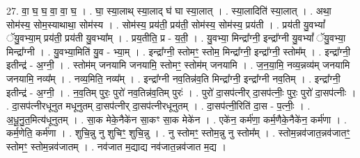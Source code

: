 \documentclass[17pt]{extarticle}
\begin{document}
27. वा॒ घ॒ घ॒ वा॒ वा॒ घ॒ । . घा॒ स्या॒लाथ् स्या॒लाद् घ॑ घा स्या॒लात् । . स्या॒लादिति॑ स्या॒लात् । . अथा॒ सोम॑स्य॒ सोम॒स्याथाथा॒ सोम॑स्य । . सोम॑स्य॒ प्रय॑ती॒ प्रय॑ती॒ सोम॑स्य॒ सोम॑स्य॒ प्रय॑ती । . प्रय॑ती यु॒वभ्यां᳚ ॅयु॒वभ्या॒म् प्रय॑ती॒ प्रय॑ती यु॒वभ्या᳚म् । . प्रय॒तीति॒ प्र - य॒ती॒ । . यु॒वभ्या॒ मिन्द्रा᳚ग्नी॒ इन्द्रा᳚ग्नी यु॒वभ्यां᳚ ॅयु॒वभ्या॒ मिन्द्रा᳚ग्नी । . यु॒वभ्या॒मिति॑ यु॒व - भ्या॒म् । . इन्द्रा᳚ग्नी॒ स्तोमꣳ॒॒ स्तोम॒ मिन्द्रा᳚ग्नी॒ इन्द्रा᳚ग्नी॒ स्तोम᳚म् । . इन्द्रा᳚ग्नी॒ इतीन्द्र॑ - अ॒ग्नी॒ । . स्तोम॑म् जनयामि जनयामि॒ स्तोमꣳ॒॒ स्तोम॑म् जनयामि । . ज॒न॒या॒मि॒ नव्य॒न्नव्य॑म् जनयामि जनयामि॒ नव्य᳚म् । . नव्य॒मिति॒ नव्य᳚म् । . इन्द्रा᳚ग्नी नव॒तिन्न॑व॒ति मिन्द्रा᳚ग्नी॒ इन्द्रा᳚ग्नी नव॒तिम् । . इन्द्रा᳚ग्नी॒ इतीन्द्र॑ - अ॒ग्नी॒ । . न॒व॒तिम् पुरः॒ पुरो॑ नव॒तिन्न॑व॒तिम् पुरः॑ । . पुरो॑ दा॒सप॑त्नीर् दा॒सप॑त्नीः॒ पुरः॒ पुरो॑ दा॒सप॑त्नीः । . दा॒सप॑त्नीरधूनुत मधूनुतम् दा॒सप॑त्नीर् दा॒सप॑त्नीरधूनुतम् । . दा॒सप॑त्नी॒रिति॑ दा॒स - प॒त्नीः॒ । . अ॒धू॒नु॒त॒मित्य॑धूनुतम् । . सा॒क मेके॒नैके॑न सा॒कꣳ सा॒क मेके॑न । . एके॑न॒ कर्म॑णा॒ कर्म॒णैके॒नैके॑न॒ कर्म॑णा । . कर्म॒णेति॒ कर्म॑णा । . शुचि॒न्नु नु शुचिꣳ॒॒ शुचि॒न्नु । . नु स्तोमꣳ॒॒ स्तोम॒न्नु नु स्तोम᳚म् । . स्तोम॒न्नव॑जात॒न्नव॑जातꣳ॒॒ स्तोमꣳ॒॒ स्तोम॒न्नव॑जातम् । . नव॑जात म॒द्याद्य नव॑जात॒न्नव॑जात म॒द्य । \newline
\end{document}
